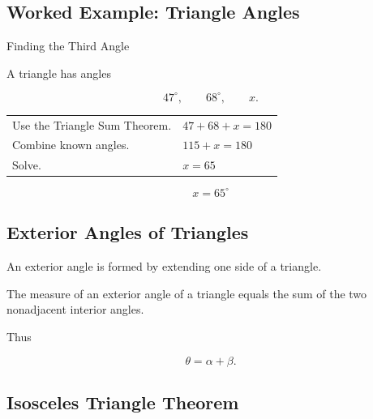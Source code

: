 \subsection{Worked Example: Triangle Angles}
\label{subsec:worked-triangle-angles}

\begin{workedexamplebox}{Finding the Third Angle}

A triangle has angles

\[ 47^\circ,\qquad68^\circ,\qquad x. \]

\begin{tabularx}{\textwidth}{@{}>{\raggedright\arraybackslash}p{}X@{}}
Use the Triangle Sum Theorem. & \(47+68+x=180\)\\
Combine known angles. & \(115+x=180\)\\
Solve. & \(x=65\)
\end{tabularx}

\begin{answerbox}
\[ \boxed{x=65^\circ} \]
\end{answerbox}
\end{workedexamplebox}

\subsection{Exterior Angles of Triangles}
\label{subsec:triangle-exterior-angle}

An exterior angle is formed by extending one side of a triangle.

\begin{theorem}
The measure of an exterior angle of a triangle equals the sum of the two
nonadjacent interior angles.
\end{theorem}

Thus

\[ \boxed{\theta=\alpha+\beta.} \]

\subsection{Isosceles Triangle Theorem}
\label{subsec:isosceles-triangle-theorem}

